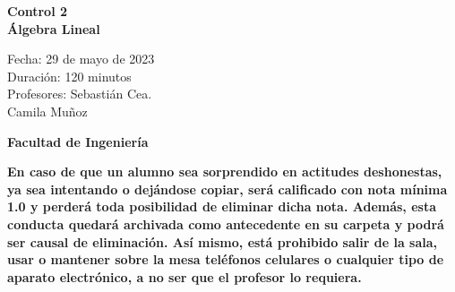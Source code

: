 \documentclass[a4paper]{article}
\begin{document}
\thispagestyle{fancy}
\vspace*{1cm}

\begin{minipage}[r]{12cm}
    \begin{flushright}
    \end{flushright}
\end{minipage}

\begin{center}
\Large{\textbf{Control 2\\ Álgebra Lineal\\ }}
\end{center}
\vspace{1cm}
\begin{minipage}[r]{15cm}
\begin{flushleft}

Fecha: 29 de mayo de 2023 \\%
Duración: 120 minutos  \\
Profesores: Sebastián Cea.\\\hspace{1.7cm} Camila Muñoz\\
\end{flushleft}
\end{minipage}
\vspace{2cm}
\begin{center}
\Large{\textbf{Facultad de Ingeniería}}
\end{center}
\vspace{1cm}
\textbf{En caso de que un alumno sea sorprendido en actitudes deshonestas, ya sea intentando o
dejándose copiar, será calificado con nota mínima 1.0 y perderá toda posibilidad de eliminar
dicha nota. Además, esta conducta quedará archivada como antecedente en su carpeta y
podrá ser causal de eliminación.
Así mismo, está prohibido salir de la sala, usar o mantener sobre la mesa teléfonos celulares
o cualquier tipo de aparato electrónico, a no ser que el profesor lo requiera.}\\



\vspace{5cm}
\newpage
\thispagestyle{empty}
\end{document}
